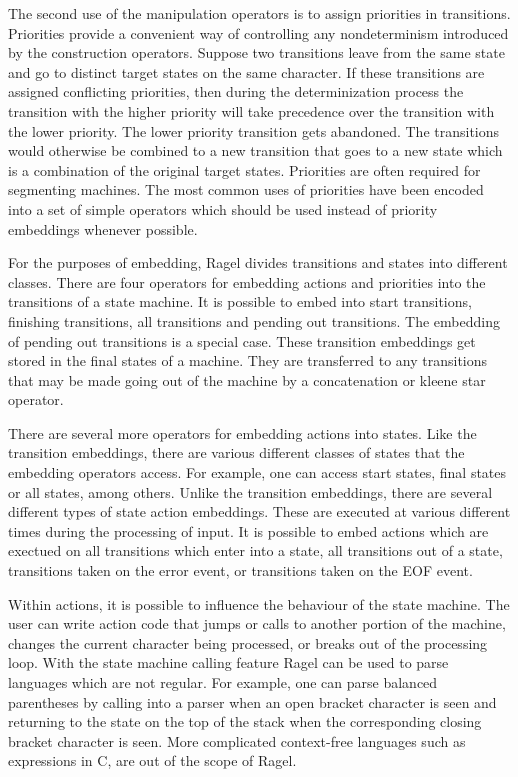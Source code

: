 \documentclass[letterpaper,11pt,oneside]{book}
\begin{document}
The second use of the manipulation operators is to assign priorities in
transitions. Priorities provide a convenient way of controlling any
nondeterminism introduced by the construction operators. Suppose two
transitions leave from the same state and go to distinct target states on the
same character. If these transitions are assigned conflicting priorities, then
during the determinization process the transition with the higher priority will
take precedence over the transition with the lower priority. The lower priority
transition gets abandoned. The transitions would otherwise be combined to a new
transition that goes to a new state which is a combination of the original
target states. Priorities are often required for segmenting machines. The most
common uses of priorities have been encoded into a set of simple operators
which should be used instead of priority embeddings whenever possible.

For the purposes of embedding, Ragel divides transitions and states into
different classes. There are four operators for embedding actions and
priorities into the transitions of a state machine. It is possible to embed
into start transitions, finishing transitions, all transitions and pending out
transitions.  The embedding of pending out transitions is a special case.
These transition embeddings get stored in the final states of a machine.  They
are transferred to any transitions that may be made going out of the machine by
a concatenation or kleene star operator.

There are several more operators for embedding actions into states. Like the
transition embeddings, there are various different classes of states that the
embedding operators access. For example, one can access start states, final
states or all states, among others. Unlike the transition embeddings, there are
several different types of state action embeddings. These are executed at
various different times during the processing of input. It is possible to embed
actions which are exectued on all transitions which enter into a state, all
transitions out of a state, transitions taken on the error event, or
transitions taken on the EOF event.

Within actions, it is possible to influence the behaviour of the state machine.
The user can write action code that jumps or calls to another portion of the
machine, changes the current character being processed, or breaks out of the
processing loop. With the state machine calling feature Ragel can be used to
parse languages which are not regular. For example, one can parse balanced
parentheses by calling into a parser when an open bracket character is seen and
returning to the state on the top of the stack when the corresponding closing
bracket character is seen. More complicated context-free languages such as
expressions in C, are out of the scope of Ragel. 
\end{document}
